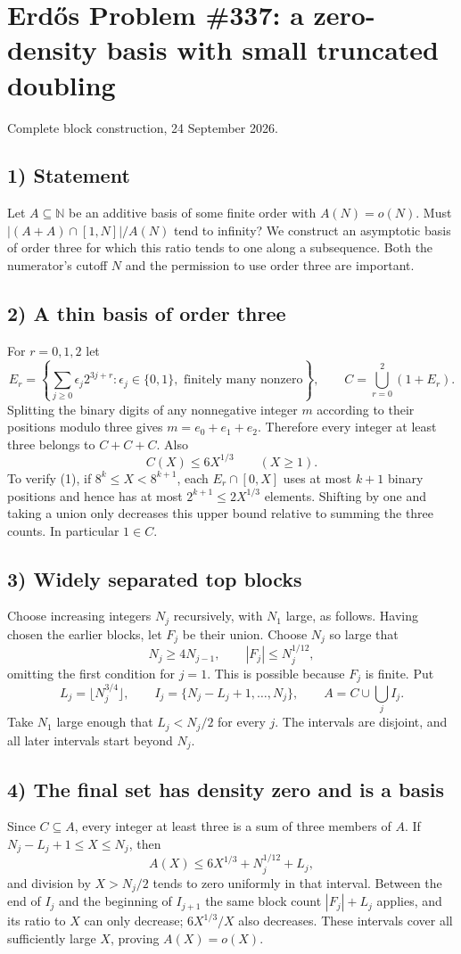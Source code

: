\section{Erd\H{o}s Problem \#337: a zero-density basis with small truncated doubling}
\noindent Complete block construction, 24 September 2026.

\subsection*{1) Statement}
Let $A\subseteq\mathbb N$ be an additive basis of some finite order with $A(N)=o(N)$. Must $|(A+A)\cap[1,N]|/A(N)$ tend to infinity? We construct an asymptotic basis of order three for which this ratio tends to one along a subsequence. Both the numerator's cutoff $N$ and the permission to use order three are important.

\subsection*{2) A thin basis of order three}
For $r=0,1,2$ let
\[E_r=\left\{\sum_{j\ge0}\epsilon_j2^{3j+r}:\epsilon_j\in\{0,1\},\text{ finitely many nonzero}\right\},\qquad C=\bigcup_{r=0}^2(1+E_r).
\]
Splitting the binary digits of any nonnegative integer $m$ according to their positions modulo three gives $m=e_0+e_1+e_2$. Therefore every integer at least three belongs to $C+C+C$. Also
\[C(X)\le6X^{1/3}\qquad(X\ge1).
\tag{1}\]
To verify (1), if $8^k\le X<8^{k+1}$, each $E_r\cap[0,X]$ uses at most $k+1$ binary positions and hence has at most $2^{k+1}\le2X^{1/3}$ elements. Shifting by one and taking a union only decreases this upper bound relative to summing the three counts. In particular $1\in C$.

\subsection*{3) Widely separated top blocks}
Choose increasing integers $N_j$ recursively, with $N_1$ large, as follows. Having chosen the earlier blocks, let $F_j$ be their union. Choose $N_j$ so large that
\[N_j\ge4N_{j-1},\qquad |F_j|\le N_j^{1/12},
\]
omitting the first condition for $j=1$. This is possible because $F_j$ is finite. Put
\[L_j=\lfloor N_j^{3/4}\rfloor,\qquad I_j=\{N_j-L_j+1,\ldots,N_j\},\qquad A=C\cup\bigcup_j I_j.
\]
Take $N_1$ large enough that $L_j<N_j/2$ for every $j$. The intervals are disjoint, and all later intervals start beyond $N_j$.

\subsection*{4) The final set has density zero and is a basis}
Since $C\subseteq A$, every integer at least three is a sum of three members of $A$. If $N_j-L_j+1\le X\le N_j$, then
\[A(X)\le6X^{1/3}+N_j^{1/12}+L_j,
\]
and division by $X>N_j/2$ tends to zero uniformly in that interval. Between the end of $I_j$ and the beginning of $I_{j+1}$ the same block count $|F_j|+L_j$ applies, and its ratio to $X$ can only decrease; $6X^{1/3}/X$ also decreases. These intervals cover all sufficiently large $X$, proving $A(X)=o(X)$.

